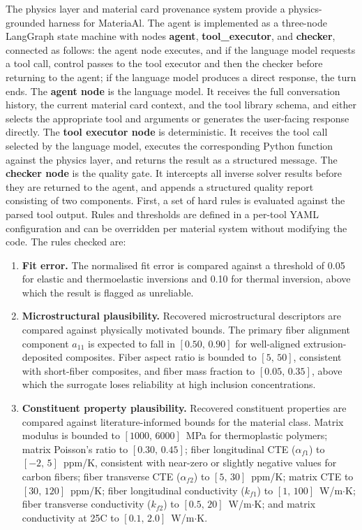 \documentclass[preprint,review,10pt,number]{elsarticle}
\begin{document}
The physics layer and material card provenance system provide a physics-grounded harness for MateriaAl.
The agent is implemented as a three-node LangGraph state machine with nodes \textbf{agent}, \textbf{tool\_executor}, and \textbf{checker}, connected as follows: the agent node executes, and if the language model requests a tool call, control passes to the tool executor and then the checker before returning to the agent; if the language model produces a direct response, the turn ends.
The \textbf{agent node} is the language model.
It receives the full conversation history, the current material card context, and the tool library schema, and either selects the appropriate tool and arguments or generates the user-facing response directly.
The \textbf{tool executor node} is deterministic.
It receives the tool call selected by the language model, executes the corresponding Python function against the physics layer, and returns the result as a structured message.
The \textbf{checker node} is the quality gate.
It intercepts all inverse solver results before they are returned to the agent, and appends a structured quality report consisting of two components.
First, a set of hard rules is evaluated against the parsed tool output.
Rules and thresholds are defined in a per-tool YAML configuration and can be overridden per material system without modifying the code.
The rules checked are:

\begin{enumerate}

\item \textbf{Fit error.}
The normalised fit error is compared against a threshold of 0.05 for elastic and thermoelastic inversions and 0.10 for thermal inversion, above which the result is flagged as unreliable.

\item \textbf{Microstructural plausibility.}
Recovered microstructural descriptors are compared against physically motivated bounds.
The primary fiber alignment component $a_{11}$ is expected to fall in $[0.50,\,0.90]$ for well-aligned extrusion-deposited composites.
Fiber aspect ratio is bounded to $[5,\,50]$, consistent with short-fiber composites, and fiber mass fraction to $[0.05,\,0.35]$, above which the surrogate loses reliability at high inclusion concentrations.

\item \textbf{Constituent property plausibility.}
Recovered constituent properties are compared against literature-informed bounds for the material class.
Matrix modulus is bounded to $[1000,\,6000]$~MPa for thermoplastic polymers; matrix Poisson's ratio to $[0.30,\,0.45]$; fiber longitudinal CTE ($\alpha_{f1}$) to $[-2,\,5]$~ppm/K, consistent with near-zero or slightly negative values for carbon fibers; fiber transverse CTE ($\alpha_{f2}$) to $[5,\,30]$~ppm/K; matrix CTE to $[30,\,120]$~ppm/K; fiber longitudinal conductivity ($k_{f1}$) to $[1,\,100]$~W/m$\cdot$K; fiber transverse conductivity ($k_{f2}$) to $[0.5,\,20]$~W/m$\cdot$K; and matrix conductivity at 25\textdegree C to $[0.1,\,2.0]$~W/m$\cdot$K.

\end{enumerate}
\end{document}
